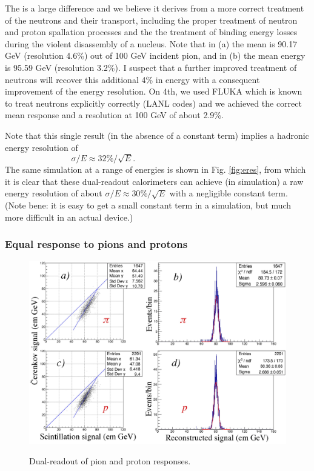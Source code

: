 The is a large difference and we believe it derives from a more correct treatment of the neutrons and their transport, including the proper treatment of neutron and proton spallation processes and the the treatment of binding energy losses during the violent disassembly of a nucleus.   Note that in (a) the mean is 90.17 GeV (resolution 4.6\%) out of 100 GeV incident pion, and in (b) the mean energy is 95.59 GeV (resolution 3.2\%).  I suspect that a further improved treatment of neutrons will recover this additional 4\% in energy with a consequent improvement of the energy resolution.   On 4th, we used FLUKA which is known to treat neutrons explicitly correctly (LANL codes) and we achieved the correct mean response and a resolution at 100 GeV of about 2.9\%.

Note that this single result (in the absence of a constant term) implies a hadronic energy resolution of
\begin{displaymath}
  \sigma / E \approx 32\% / \sqrt{E}.  ~~~~~~~~~~~~~~~~~~~~~~~~~~~~~~~~~~~~~~~~~~~~~~~~~~~~~~~~~~
\end{displaymath}
The same simulation at a range of energies is shown in Fig. \ref{fig:eres}, from which it is clear that these dual-readout calorimeters can achieve (in simulation) a raw energy resolution of about $\sigma/E \approx 30\% / \sqrt{E}$ with a negligible constant term.  (Note bene:  it is easy to get a small constant term in a simulation, but much more difficult in an actual device.)



\subsubsection{Equal response to pions and protons}     \label{sec:pi-p}



\begin{figure}
 \centering
 \includegraphics[scale=0.09]{f42-pion-proton.jpg}
 \label{fig:pi-p}
 \caption{Dual-readout of pion and proton responses.}
\end{figure}



